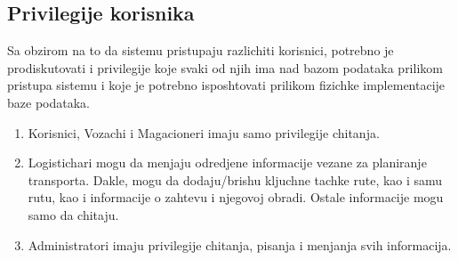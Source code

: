 \begin{itemize}
\begin{itemize}
        
        
    \end{itemize}

\end{itemize}



\subsection{Privilegije korisnika}
Sa obzirom na to da sistemu pristupaju razlichiti korisnici, potrebno je prodiskutovati i privilegije koje svaki od njih ima nad bazom podataka prilikom pristupa sistemu i koje je potrebno isposhtovati prilikom fizichke implementacije baze podataka.

\begin{enumerate}
    \item Korisnici, Vozachi i Magacioneri imaju samo privilegije chitanja.
    \item Logistichari mogu da menjaju odredjene informacije vezane za planiranje transporta. Dakle, mogu da dodaju/brishu kljuchne tachke rute, kao i samu rutu, kao i informacije o zahtevu i njegovoj obradi. Ostale informacije mogu samo da chitaju.

    \item Administratori imaju privilegije chitanja, pisanja i menjanja svih informacija.

\end{enumerate}

